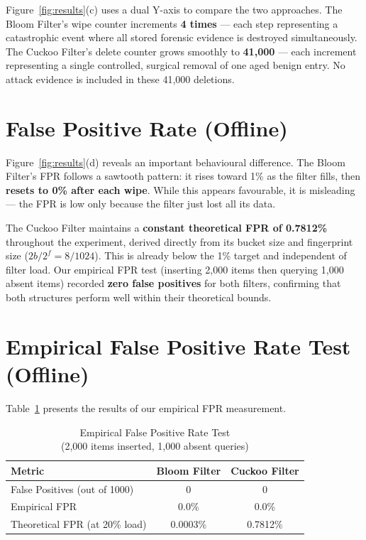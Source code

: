 \documentclass[12pt, a4paper]{report}
\begin{document}
Figure~\ref{fig:results}(c) uses a dual Y-axis to compare the two
approaches. The Bloom Filter's wipe counter increments \textbf{4 times}
--- each step representing a catastrophic event where all stored forensic
evidence is destroyed simultaneously. The Cuckoo Filter's delete counter
grows smoothly to \textbf{41{,}000} --- each increment representing a
single controlled, surgical removal of one aged benign entry. No attack
evidence is included in these 41{,}000 deletions.

\section{False Positive Rate (Offline)}

Figure~\ref{fig:results}(d) reveals an important behavioural difference.
The Bloom Filter's FPR follows a sawtooth pattern: it rises toward 1\% as
the filter fills, then \textbf{resets to 0\% after each wipe}. While this
appears favourable, it is misleading --- the FPR is low only because the
filter just lost all its data.

The Cuckoo Filter maintains a \textbf{constant theoretical FPR of
0.7812\%} throughout the experiment, derived directly from its bucket
size and fingerprint size ($2b/2^{f} = 8/1024$). This is already below
the 1\% target and independent of filter load. Our empirical FPR test
(inserting 2{,}000 items then querying 1{,}000 absent items) recorded
\textbf{zero false positives} for both filters, confirming that both
structures perform well within their theoretical bounds.

\section{Empirical False Positive Rate Test (Offline)}

Table~\ref{tab:fpr} presents the results of our empirical FPR measurement.

\begin{table}[H]
\centering
\caption{Empirical False Positive Rate Test\\(2{,}000 items inserted, 1{,}000 absent queries)}
\label{tab:fpr}
\begin{tabular}{lcc}
\toprule
\textbf{Metric} & \textbf{Bloom Filter} & \textbf{Cuckoo Filter} \\
\midrule
False Positives (out of 1000) & 0         & 0         \\
Empirical FPR                 & 0.0\%     & 0.0\%     \\
Theoretical FPR (at 20\% load) & 0.0003\% & 0.7812\%  \\
\bottomrule
\end{tabular}
\end{table}
\end{document}
